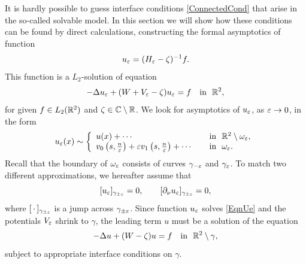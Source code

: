 It is hardly possible to guess interface conditions \eqref{ConnectedCond}
that arise in the so-called solvable model. In this section we will show how these conditions can be found by direct calculations, constructing the formal asymptotics of  function
\begin{equation}\label{Ueps}
u_\varepsilon=(H_\varepsilon-\zeta)^{-1}f.
\end{equation}
This function is a $L_2$-solution of equation
\begin{equation}\label{EqnUe}
-\Delta u_\varepsilon +(W+V_\varepsilon-\zeta) u_\varepsilon= f\quad \hbox{in \ } \mathbb R^2,
\end{equation}
for given $f\in L_2(\mathbb R^2)$ and $\zeta\in \mathbb{C}\setminus\mathbb R$.
We  look for asymptotics of $u_\varepsilon$, as $\varepsilon\to 0$, in the form
\begin{equation}\label{AsymptoticsWe}
u_\varepsilon(x)\sim
\left\{
  \begin{array}{ll}
    u(x)+\cdots&\quad \hbox{in \ }\mathbb R^2\setminus \omega_\varepsilon, \\
    v_0\left(s,\textstyle\frac n{\varepsilon}\right)+\varepsilon v_1\left(s,\textstyle\frac n{\varepsilon}\right)+\cdots
&\quad \hbox{in \ } \omega_\varepsilon.
  \end{array}
\right.
\end{equation}
Recall that the boundary of $\omega_\varepsilon$ consists of  curves
$\gamma_{-\varepsilon}$ and $\gamma_{\varepsilon}$.
To match two different approximations, we hereafter assume that
\begin{equation}\label{MatchingCnds}
  [u_\varepsilon]_{\gamma_{\pm\varepsilon}}=0, \qquad [\partial_\nu u_\varepsilon]_{\gamma_{\pm\varepsilon}}=0,
\end{equation}
where $[\,\cdot\,]_{\gamma_{\pm\varepsilon}}$ is a jump  across $\gamma_{\pm\varepsilon}$.
Since function $u_\varepsilon$ solves \eqref{EqnUe} and the potentials $V_\varepsilon$ shrink to $\gamma$, the leading term $u$ must be a solution of the equation
$$
-\Delta u+(W-\zeta)u= f \quad \hbox{in \ } \mathbb R^2\setminus \gamma,
$$
subject to appropriate interface conditions on $\gamma$.

